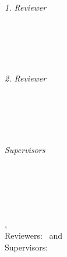 \begin{titlepage}
    \vfill
    \begin{minipage}[t]{.27\textwidth}
        \raggedleft
        \textit{1. Reviewer}
    \end{minipage}
    \hspace*{15pt}
    \begin{minipage}[t]{.65\textwidth}
        {\Large \thesisFirstReviewer} \\
        {\small \thesisFirstReviewerDepartment} \\[-1mm]
        {\small \thesisFirstReviewerUniversity}
    \end{minipage} \\[5mm]
    \begin{minipage}[t]{.27\textwidth}
        \raggedleft
        \textit{2. Reviewer}
    \end{minipage}
    \hspace*{15pt}
    \begin{minipage}[t]{.65\textwidth}
        {\Large \thesisSecondReviewer} \\
        {\small \thesisSecondReviewerDepartment} \\[-1mm]
        {\small \thesisSecondReviewerUniversity}
    \end{minipage} \\[10mm]
    \begin{minipage}[t]{.27\textwidth}
        \raggedleft
        \textit{Supervisors}
    \end{minipage}
    \hspace*{15pt}
    \begin{minipage}[t]{.65\textwidth}
        \thesisFirstSupervisor%
    \end{minipage} \\[10mm]

    \thesisDate \\

\end{titlepage}


\hfill
\vfill

{
    \small
    \textbf{\thesisName} \\
    \textit{\thesisTitle} \\
    \thesisSubject, \thesisDate \\
    Reviewers: \thesisFirstReviewer\ and \thesisSecondReviewer \\
    Supervisors: \thesisFirstSupervisor \\[1.5em]%
    \textbf{\thesisUniversity} \\
    \thesisUniversityInstitute \\
    \thesisUniversityStreetAddress \\
    \thesisUniversityPostalCode\ \thesisUniversityCity
}
